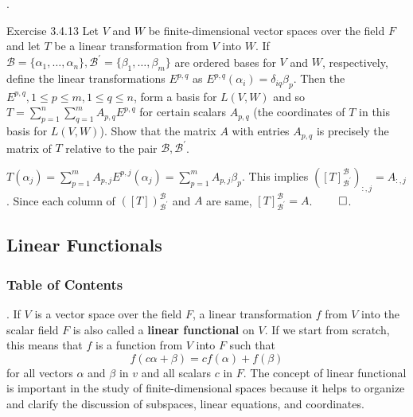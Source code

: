 \documentclass[8pt]{beamer}
\newcommand{\mc}[1]{\mathcal{#1}}
\newcommand{\tb}[1]{\textbf{#1}}
\begin{document}
\begin{frame}{.}
    \begin{block}{Exercise 3.4.13}
        Let $V$ and $W$ be finite-dimensional vector spaces over the field $F$ and let $T$ be a linear transformation from $V$ into $W$.
        If $\mc{B} = \{\alpha_1, \dots, \alpha_n\}, \mc{B}^\prime = \{\beta_1, \dots, \beta_m\}$ are ordered bases for $V$ and $W$, respectively, define the linear transformations $E^{p,q}$ as $E^{p,q}(\alpha_i) = \delta_{iq} \beta_p$.
        Then the $E^{p,q}, 1 \leq p \leq m, 1 \leq q \leq n$, form a basis for $L(V,W)$ and so $T = \sum_{p=1}^n \sum_{q=1}^m A_{p,q} E^{p,q}$ for certain scalars $A_{p,q}$ (the coordinates of $T$ in this basis for $L(V,W)$).
        Show that the matrix $A$ with entries $A_{p,q}$ is precisely the matrix of $T$ relative to the pair $\mc{B}, \mc{B}^\prime$.
    \end{block}

    $T(\alpha_j) = \sum_{p=1}^m A_{p,j} E^{p,j}(\alpha_j) = \sum_{p=1}^m A_{p,j} \beta_p$.
    This implies $([T]^{\mc{B}}_{\mc{B}^\prime})_{:, j} = A_{:, j}$.
    Since each column of $([T])_{\mc{B}^\prime}^{\mc{B}}$ and $A$ are same, $[T]_{\mc{B}^\prime}^{\mc{B}} = A$.
    $\qed$.
\end{frame}

\subsection{Linear Functionals}
\begingroup
    \begin{frame}
        \frametitle{Table of Contents}
        \tableofcontents[currentsubsection]
    \end{frame}
\endgroup

\begin{frame}{.}
    If $V$ is a vector space over the field $F$, a linear transformation $f$ from $V$ into the scalar field $F$ is also called a \tb{linear functional} on $V$.
    If we start from scratch, this means that $f$ is a function from $V$ into $F$ such that
    \[
        f(c \alpha + \beta) = c f(\alpha) + f(\beta)
    \]
    for all vectors $\alpha$ and $\beta$ in $v$ and all scalars $c$ in $F$.
    The concept of linear functional is important in the study of finite-dimensional spaces because it helps to organize and clarify the discussion of subspaces, linear equations, and coordinates.


\end{frame}
\end{document}
